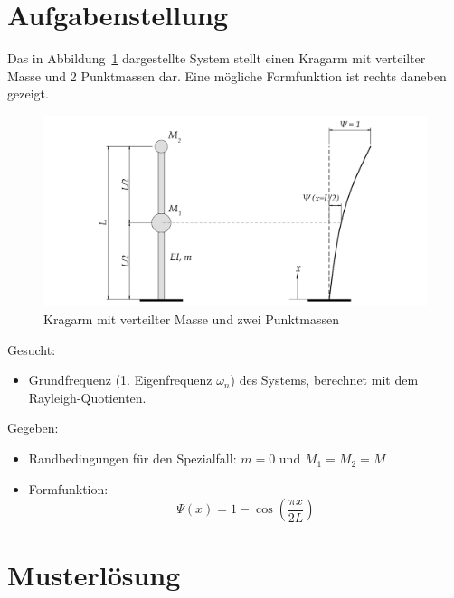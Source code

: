 \documentclass[
  letterpaper,
  DIV=11]{scrreprt}
\providecommand{\tightlist}{%
  \setlength{\itemsep}{0pt}\setlength{\parskip}{0pt}}\usepackage{longtable,booktabs,array}
\begin{document}
\hypertarget{aufgabenstellung}{%
\section{Aufgabenstellung}\label{aufgabenstellung}}

Das in Abbildung~\ref{fig-kragarm_2_punkte} dargestellte System stellt
einen Kragarm mit verteilter Masse und 2 Punktmassen dar. Eine mögliche
Formfunktion ist rechts daneben gezeigt.

\begin{figure}[H]

{\centering \includegraphics{index_files/mediabag/bilder/aufgabe_rayleigh_2_massen.pdf}

}

\caption{\label{fig-kragarm_2_punkte}Kragarm mit verteilter Masse und
zwei Punktmassen}

\end{figure}

Gesucht:

\begin{itemize}
\tightlist
\item
  Grundfrequenz (1. Eigenfrequenz \(\omega_n\)) des Systems, berechnet
  mit dem Rayleigh-Quotienten.
\end{itemize}

Gegeben:

\begin{itemize}
\tightlist
\item
  Randbedingungen für den Spezialfall:
  \(m = 0 \text{ und } M_1 = M_2 = M\)
\item
  Formfunktion: \[ \Psi(x) = 1 - \cos(\frac{\pi x}{2L})\]
\end{itemize}

\newpage{}

\hypertarget{sec-ml_2punktmassen}{%
\section{Musterlösung}\label{sec-ml_2punktmassen}}
\end{document}
